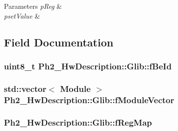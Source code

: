 \begin{DoxyParams}{Parameters}
{\em p\-Reg} & \\
\hline
{\em pset\-Value} & \\
\hline
\end{DoxyParams}


\subsection{Field Documentation}
\hypertarget{class_ph2___hw_description_1_1_glib_ac89e9a9eee11e41f901e90c619e50bfc}{
\subsubsection[{f\-Be\-Id}]{\setlength{\rightskip}{0pt plus 5cm}uint8\-\_\-t Ph2\-\_\-\-Hw\-Description\-::\-Glib\-::f\-Be\-Id\hspace{0.3cm}{\ttfamily [protected]}}}\label{class_ph2___hw_description_1_1_glib_ac89e9a9eee11e41f901e90c619e50bfc}
\hypertarget{class_ph2___hw_description_1_1_glib_a97b6535900b4fa8eef81c7e15a01cda4}{
\subsubsection[{f\-Module\-Vector}]{\setlength{\rightskip}{0pt plus 5cm}std\-::vector$<$ {\bf Module} $>$ Ph2\-\_\-\-Hw\-Description\-::\-Glib\-::f\-Module\-Vector\hspace{0.3cm}{\ttfamily [protected]}}}\label{class_ph2___hw_description_1_1_glib_a97b6535900b4fa8eef81c7e15a01cda4}
\hypertarget{class_ph2___hw_description_1_1_glib_a1a0c6dba5a24c615e8609b03012a8970}{
\subsubsection[{f\-Reg\-Map}]{ Ph2\-\_\-\-Hw\-Description\-::\-Glib\-::f\-Reg\-Map\hspace{0.3cm}{\ttfamily [protected]}}}\label{class_ph2___hw_description_1_1_glib_a1a0c6dba5a24c615e8609b03012a8970}
